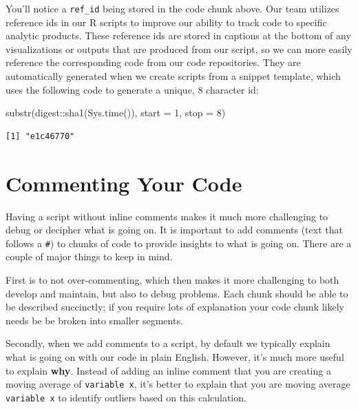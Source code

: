 \documentclass[
  letterpaper,
  DIV=11,
  numbers=noendperiod]{scrreprt}
\newenvironment{Shaded}{\begin{snugshade}}{\end{snugshade}}
\newcommand{\AttributeTok}[1]{\textcolor[rgb]{0.40,0.45,0.13}{#1}}
\newcommand{\DecValTok}[1]{\textcolor[rgb]{0.68,0.00,0.00}{#1}}
\newcommand{\FunctionTok}[1]{\textcolor[rgb]{0.28,0.35,0.67}{#1}}
\newcommand{\NormalTok}[1]{\textcolor[rgb]{0.00,0.23,0.31}{#1}}
\newcommand{\SpecialCharTok}[1]{\textcolor[rgb]{0.37,0.37,0.37}{#1}}
\begin{document}
You'll notice a \texttt{ref\_id} being stored in the code chunk above.
Our team utilizes reference ids in our R scripts to improve our ability
to track code to specific analytic products. These reference ids are
stored in captions at the bottom of any visualizations or outputs that
are produced from our script, so we can more easily reference the
corresponding code from our code repositories. They are automatically
generated when we create scripts from a snippet template, which uses the
following code to generate a unique, 8 character id:

\begin{Shaded}
\begin{Highlighting}[]
\FunctionTok{substr}\NormalTok{(digest}\SpecialCharTok{::}\FunctionTok{sha1}\NormalTok{(}\FunctionTok{Sys.time}\NormalTok{()), }\AttributeTok{start =} \DecValTok{1}\NormalTok{, }\AttributeTok{stop =} \DecValTok{8}\NormalTok{)}
\end{Highlighting}
\end{Shaded}

\begin{verbatim}
[1] "e1c46770"
\end{verbatim}

\hypertarget{commenting-your-code}{%
\section{Commenting Your Code}\label{commenting-your-code}}

Having a script without inline comments makes it much more challenging
to debug or decipher what is going on. It is important to add comments
(text that follows a \texttt{\#}) to chunks of code to provide insights
to what is going on. There are a couple of major things to keep in mind.

First is to not over-commenting, which then makes it more challenging to
both develop and maintain, but also to debug problems. Each chunk should
be able to be described succinctly; if you require lots of explanation
your code chunk likely needs be be broken into smaller segments.

Secondly, when we add comments to a script, by default we typically
explain what is going on with our code in plain English. However, it's
much more useful to explain \textbf{why}. Instead of adding an inline
comment that you are creating a moving average of \texttt{variable\ x},
it's better to explain that you are moving average \texttt{variable\ x}
to identify outliers based on this calculation.
\end{document}
